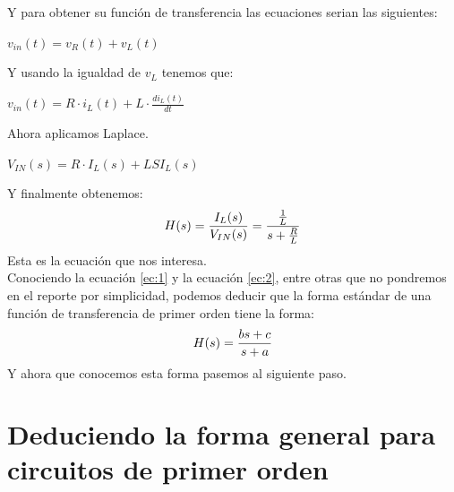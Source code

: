\documentclass[letterpaper,spanish,12pt]{report}
\begin{document}
Y para obtener su funci\'on de transferencia las ecuaciones serian las siguientes:
	\begin{center} $v_{in}(t) = v_{R}(t) + v_{L}(t)$\end{center}
Y usando la igualdad de $v_{L}$ tenemos que:
	\begin{center} $v_{in}(t) = R \cdot i_{L}(t) + L \cdot \frac{di_{L}(t)}{dt}$\end{center}
Ahora aplicamos Laplace.
	\begin{center} $V_{IN}(s) = R \cdot I_{L}(s) + LSI_{L}(s)$\end{center}
Y finalmente obtenemos:
	\begin{equation}
		\centering
			H(s) = \frac {I_{L}(s)} {V_{IN}(s)} = \frac {\frac{1}{L}} {s + \frac{R}{L}}
		\label{ec:2}
	\end{equation}
Esta es la ecuaci\'on que nos interesa.\medskip \\ Conociendo la ecuaci\'on \ref{ec:1} y la ecuaci\'on \ref{ec:2}, entre otras que no pondremos en el reporte por simplicidad, podemos deducir que la forma est\'andar de una funci\'on de transferencia de primer orden tiene la forma:
	\begin{equation}
		\centering
			H(s) = \frac {bs + c} {s + a}
		\label{ec:3}
	\end{equation}
Y ahora que conocemos esta forma pasemos al siguiente paso.

	\section{Deduciendo la forma general para circuitos de primer orden}
\end{document}
